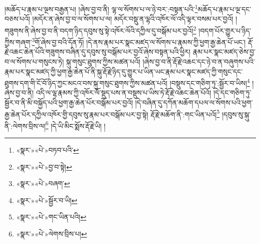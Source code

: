 །མཆོད་པ་རྣམ་པ་ལྔས་བརྒྱན་པ། །ཞེས་བྱ་བ་ནི། ལྷ་ལ་སོགས་པ་ལ་ཉེ་བར་:བསྟན་པའི་\footnote{«སྣར་»«པེ་»བཏབ་པའི་}མཆོད་པ་རྣམ་པ་ལྔ་དང་བཅས་པའོ། །མདོར་ན་ཞེས་བྱ་བ་ལ་སོགས་པ་ལ། མདོར་བསྡུ་ན་ལྷའི་འཁོར་ལོ་འདི་ལྟར་བསམ་པར་བྱའོ། །གཟུགས་ནི་ཞེས་བྱ་བ་ནི་བདག་ཉིད་དབུས་སུ་སྟེ་འཁོར་ལོའི་དཀྱིལ་དུ་བསྒོམ་པར་བྱའོ།\footnote{«སྣར་»«པེ་»བྱ་བ་སྟེ།} །བདག་པོར་གྱུར་པ་ཉིད་ཀྱིས་གཞག་\footnote{«སྣར་»«པེ་»བཞག་}གོ་ཞེས་བྱ་བའི་དོན་ཏོ། །དེ་ནས་རྣམ་པར་སྣང་མཛད་ལ་སོགས་པ་རྣམས་ཀྱི་ཕྱག་རྒྱ་ཆེན་པོ་ཡང་། རྡོ་རྗེ་འཆང་ཆེན་པོའི་གཟུགས་བཞིན་དུ་དབུས་སུ་བསྒོམ་པར་བྱའོ་ཞེས་བསྟན་པའི་ཕྱིར། རྣམ་པར་སྣང་མཛད་ཅེས་བྱ་བ་ལ་སོགས་པ་གསུངས་ཏེ། སྐུ་གསུང་ཐུགས་ཀྱིས་མཚན་པའོ། །ཞེས་བྱ་བ་ནི་རྡོ་རྗེ་འཆང་དང་ཉེ་བ་ན་བཞུགས་པའི་རྣམ་པར་སྣང་མཛད་ཀྱི་ཕྱག་རྒྱ་ཆེན་པོ་ནི་སྐུ་རྡོ་རྗེ་ཉིད་དུ་གྱུར་པ་ཡིན་ཡང་རྣམ་པར་སྣང་མཛད་ཀྱི་གསུང་དང་ཐུགས་དག་གི་ངོ་བོ་ཉིད་ཀྱང་མངའ་བས་སྐུ་གསུང་ཐུགས་ཀྱིས་མཚན་པའོ། །བསྡུས་དང་གཅིག་ཏུ་:སྦྱོར་བ་ཡིས།\footnote{«སྣར་»«པེ་»སྦྱོར་བ་ཡི།} །ཞེས་བྱ་བ་ནི། འདི་ལ་ལྷ་རྣམས་ཀྱི་འཁོར་ལོ་སྡུད་པས་ན་བསྡུས་པ་ཡིས་ཏེ་རྡོ་རྗེ་འཆང་ཆེན་པོའོ། །དེ་དང་གཅིག་ཏུ་སྦྱོར་བ་ནི་མི་བསྐྱོད་པའི་ཕྱག་རྒྱ་ཆེན་པོར་བསྒོམ་པར་བྱའོ། །དེ་བཞིན་དུ་དཀོན་མཆོག་དཔལ་ལ་སོགས་པའི་ཕྱག་རྒྱ་ཆེན་པོར་དཀྱིལ་འཁོར་གྱི་དབུས་སུ་རྣམ་པར་བསྒོམ་པར་བྱ་སྟེ། རྡོ་རྗེ་མཆོག་ནི་:གང་ཡིན་པའོ།\footnote{«སྣར་»«པེ་»གང་ཡིན་པའི།} །དབུས་སུ་སྐུ་ནི་:ལེགས་བྲིས་ལ།\footnote{«སྣར་»«པེ་»ལེགས་བྲིས་པ།} །དེ་ཡི་མིང་སྨོས་རྡོ་རྗེ་ཡི། །
